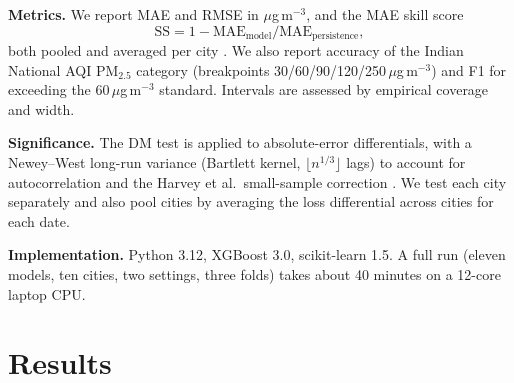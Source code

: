 \documentclass[conference]{IEEEtran}
\begin{document}
\textbf{Metrics.} We report MAE and RMSE in $\mu$g\,m$^{-3}$, and the MAE skill score
\begin{equation}
\mathrm{SS}=1-\mathrm{MAE}_{\text{model}}/\mathrm{MAE}_{\text{persistence}},
\end{equation}
both pooled and averaged per city \cite{murphy1988}. We also report accuracy of the Indian
National AQI PM$_{2.5}$ category (breakpoints 30/60/90/120/250\,$\mu$g\,m$^{-3}$) and F1
for exceeding the 60\,$\mu$g\,m$^{-3}$ standard. Intervals are assessed by empirical
coverage and width.

\textbf{Significance.} The DM test \cite{diebold1995} is applied to absolute-error
differentials, with a Newey--West long-run variance (Bartlett kernel,
$\lfloor n^{1/3}\rfloor$ lags) to account for autocorrelation and the Harvey et al.\
small-sample correction \cite{harvey1997}. We test each city separately and also pool
cities by averaging the loss differential across cities for each date.

\textbf{Implementation.} Python 3.12, XGBoost 3.0, scikit-learn 1.5. A full run
(eleven models, ten cities, two settings, three folds) takes about 40 minutes on a
12-core laptop CPU.

\section{Results}\label{sec:results}
\end{document}
